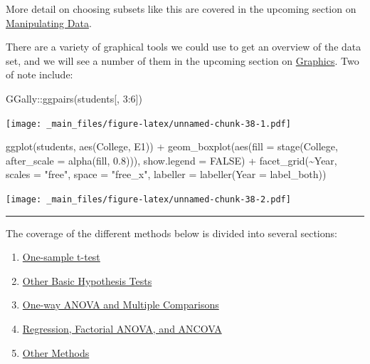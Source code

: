 \documentclass[
]{book}
\newenvironment{Shaded}{\begin{snugshade}}{\end{snugshade}}
\newcommand{\AttributeTok}[1]{\textcolor[rgb]{0.77,0.63,0.00}{#1}}
\newcommand{\ConstantTok}[1]{\textcolor[rgb]{0.00,0.00,0.00}{#1}}
\newcommand{\DecValTok}[1]{\textcolor[rgb]{0.00,0.00,0.81}{#1}}
\newcommand{\FloatTok}[1]{\textcolor[rgb]{0.00,0.00,0.81}{#1}}
\newcommand{\FunctionTok}[1]{\textcolor[rgb]{0.00,0.00,0.00}{#1}}
\newcommand{\NormalTok}[1]{#1}
\newcommand{\SpecialCharTok}[1]{\textcolor[rgb]{0.00,0.00,0.00}{#1}}
\newcommand{\StringTok}[1]{\textcolor[rgb]{0.31,0.60,0.02}{#1}}
\providecommand{\tightlist}{%
  \setlength{\itemsep}{0pt}\setlength{\parskip}{0pt}}
\begin{document}
More detail on choosing subsets like this are covered in the upcoming section on \protect\hyperlink{manipulating-data}{Manipulating Data}.

There are a variety of graphical tools we could use to get an overview of the data set, and we will see a number of them in the upcoming section on \protect\hyperlink{graphics}{Graphics}. Two of note include:

\begin{Shaded}
\begin{Highlighting}[]
\NormalTok{GGally}\SpecialCharTok{::}\FunctionTok{ggpairs}\NormalTok{(students[, }\DecValTok{3}\SpecialCharTok{:}\DecValTok{6}\NormalTok{])}
\end{Highlighting}
\end{Shaded}

\texttt{[image: \_main\_files/figure-latex/unnamed-chunk-38-1.pdf]}

\begin{Shaded}
\begin{Highlighting}[]
\FunctionTok{ggplot}\NormalTok{(students, }\FunctionTok{aes}\NormalTok{(College, E1)) }\SpecialCharTok{+}
  \FunctionTok{geom\_boxplot}\NormalTok{(}\FunctionTok{aes}\NormalTok{(}\AttributeTok{fill =} \FunctionTok{stage}\NormalTok{(College, }\AttributeTok{after\_scale =} \FunctionTok{alpha}\NormalTok{(fill, }\FloatTok{0.8}\NormalTok{))), }\AttributeTok{show.legend =} \ConstantTok{FALSE}\NormalTok{) }\SpecialCharTok{+}
  \FunctionTok{facet\_grid}\NormalTok{(}\SpecialCharTok{\textasciitilde{}}\NormalTok{Year, }\AttributeTok{scales =} \StringTok{"free"}\NormalTok{, }\AttributeTok{space =} \StringTok{"free\_x"}\NormalTok{, }\AttributeTok{labeller =} \FunctionTok{labeller}\NormalTok{(}\AttributeTok{Year =}\NormalTok{ label\_both))}
\end{Highlighting}
\end{Shaded}

\texttt{[image: \_main\_files/figure-latex/unnamed-chunk-38-2.pdf]}

\begin{center}\rule{0.5\linewidth}{0.5pt}\end{center}

The coverage of the different methods below is divided into several sections:

\begin{enumerate}
\def\labelenumi{\arabic{enumi}.}
\tightlist
\item
  \protect\hyperlink{one-sample-t-test}{One-sample t-test}
\item
  \protect\hyperlink{other-hypothesis-tests}{Other Basic Hypothesis Tests}
\item
  \protect\hyperlink{one-way-anova}{One-way ANOVA and Multiple Comparisons}
\item
  \protect\hyperlink{regression-ancova}{Regression, Factorial ANOVA, and ANCOVA}
\item
  \protect\hyperlink{other-methods}{Other Methods}
\end{enumerate}
\end{document}
